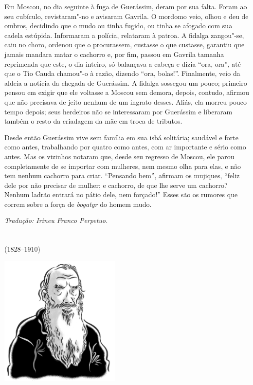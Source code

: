 Em Moscou, no dia seguinte à fuga de Guerássim, deram por sua falta.
Foram ao seu cubículo, revistaram"-no e avisaram Gavrila. O mordomo veio,
olhou e deu de ombros, decidindo que o mudo ou tinha fugido, ou tinha se
afogado com sua cadela estúpida. Informaram a polícia, relataram à
patroa. A fidalga zangou"-se, caiu no choro, ordenou que o procurassem,
custasse o que custasse, garantiu que jamais mandara matar o cachorro e,
por fim, passou em Gavrila tamanha reprimenda que este, o dia inteiro,
só balançava a cabeça e dizia ``ora, ora'', até que o Tio Cauda chamou"-o
à razão, dizendo ``ora, bolas!''. Finalmente, veio da aldeia a notícia
da chegada de Guerássim. A fidalga sossegou um pouco; primeiro pensou em
exigir que ele voltasse a Moscou sem demora, depois, contudo, afirmou
que não precisava de jeito nenhum de um ingrato desses. Aliás, ela
morreu pouco tempo depois; seus herdeiros não se interessaram por
Guerássim e liberaram também o resto da criadagem da mãe em troca de
tributos.

Desde então Guerássim vive sem família em sua isbá solitária; saudável e
forte como antes, trabalhando por quatro como antes, com ar importante e
sério como antes. Mas os vizinhos notaram que, desde seu regresso de
Moscou, ele parou completamente de se importar com mulheres, nem mesmo
olha para elas, e não tem nenhum cachorro para criar. ``Pensando bem'',
afirmam os mujiques, ``feliz dele por não precisar de mulher; e
cachorro, de que lhe serve um cachorro? Nenhum ladrão entrará no pátio
dele, nem forçado!'' Esses são os rumores que correm sobre a força de
\emph{bogatyr} do homem mudo.

\medskip

{\footnotesize\hfill\emph{Tradução: Irineu Franco Perpetuo.}}


\chapter*{}
\label{part4}
\thispagestyle{empty}

\begin{vplace}[1.5]
{\HUGES\hfill{}}

{\LARGE\hfill\textlt(1828–1910)}
\end{vplace}


\pagebreak
\thispagestyle{empty}
\mbox{}
\vfill
\begin{center}
\includegraphics[width=6cm]{./imgs/autor4.jpg}
\end{center}


